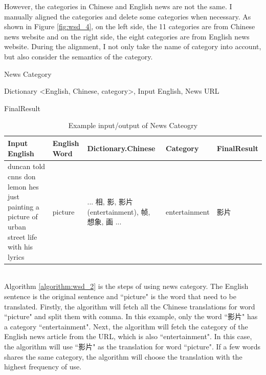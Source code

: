 However, the categories in Chinese and English news are not the same.
I manually aligned the categories and delete some categories when necessary.
As shown in Figure \ref{fig:wsd_4}, 
on the left side, the 11 categories are from Chinese news website and on the right side, the eight categories are from English news website. 
During the alignment, I not only take the name of category into account, but also consider the semantics of the category.
\\
\begin{algorithm}[ht]
\caption{News Category}
\label{algorithm:wsd_2}
\begin{algorithmic}
\REQUIRE Dictionary \textless English, Chinese, category\textgreater, Input English, News URL

        \ENDIF
    \ENDFOR
\ENDIF
\RETURN FinalResult

\end{algorithmic}
\end{algorithm}
\begin{table}[ht]
    \caption{Example input/output of News Cateogry}
    \begin{tabular}{| p{4cm} | p{1.5cm} | p{3cm} | p{3cm} | p{2cm} |}
        \hline
        Input English & English Word & Dictionary.Chinese & Category & FinalResult \\
        \hline
        duncan told cnns don lemon hes just painting a picture of urban street life with his lyrics & picture & ... 相, 影, 影片(entertainment), 帧, 想象, 画 ... & entertainment & 影片 \\
        \hline
    \end{tabular}
\end{table}
\\
Algorithm \ref{algorithm:wsd_2} is the steps of using news category. The English sentence is the original sentence and ``picture" is the word that need to be translated. Firstly, the algorithm will fetch all the Chinese translations for word ``picture" and split them with comma. In this example, only the word ``影片" has a category ``entertainment". Next, the algorithm will fetch the category of the English news article from the URL, which is also ``entertainment".
In this case, the algorithm will use ``影片" as the translation for word ``picture". If a few words shares the same category, the algorithm will choose the translation with the highest frequency of use.
